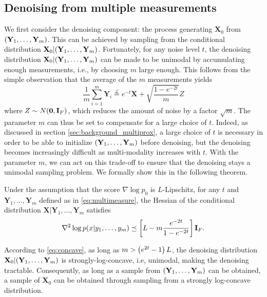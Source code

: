 \subsection{Denoising from multiple measurements}
We first consider the denoising component: the process generating $\mathbf{X}_0$ from $\mathopen{}\left(\mathbf{Y}_1, \dots, \mathbf{Y}_m\right)$. This can be achieved by sampling from the conditional distribution $\mathbf{X}_0|\mathopen{}\left(\mathbf{Y}_1, \dots, \mathbf{Y}_m\right)$. Fortunately, for any noise level $t$, the denoising distribution $\mathbf{X}_0|\mathopen{}\left(\mathbf{Y}_1, \dots, \mathbf{Y}_m\right)$ can be made to be unimodal by accumulating enough measurements, i.e., by choosing $m$ large enough. This follows from the simple observation that the average of the $m$ measurements yields
\begin{equation}
\frac{1}{m}\sum_{i=1}^m \mathbf{Y}_i \overset{\mathcal{L}}{=}  e^{-t} \mathbf{X} + \sqrt{\frac{1 - e^{-2t}}{m}}Z
\label{eq:noisereduction}
\end{equation}
where $Z \sim N\mathopen{}\left(\mathbf{0}, \mathbf{I}_F\right)$, which reduces the amount of noise by a factor $\sqrt{m}$. The parameter $m$ can thus be set to compensate for a large choice of $t$. Indeed, as discussed in section \ref{sec:background_multiprox}, a large choice of $t$ is necessary in order to be able to initialize $\mathopen{}\left(\mathbf{Y}_1, \dots, \mathbf{Y}_m\right)$ before denoising, but the denoising becomes increasingly difficult as multi-modality increases with $t$. With the parameter $m$, we can act on this trade-off to ensure that the denoising stays a unimodal sampling problem. We formally show this in the following theorem. 

\begin{theorem}
\label{thm:unimodality}
    Under the assumption that the score $\nabla \log p_0$ is $L$-Lipschitz, for any $t$ and $\mathbf{Y}_1, \dots, \mathbf{Y}_m$ defined as in \eqref{eq:multimeasure}, the Hessian of the conditional distribution $\mathbf{X}|\mathbf{Y}_1, \dots, \mathbf{Y}_m$ satisfies
    \begin{equation}
    \nabla ^2 \log p(x|y_1, \dots, y_m) \preceq \mathopen{}\left[L - m\frac{e^{-2t}}{1 - e^{-2t}}\right]\mathbf{I}_F.
    \label{eq:concave}
    \end{equation}
\end{theorem}

According to \eqref{eq:concave}, as long as $m > \mathopen{}\left(e^{2t} - 1\right) L$, the denoising distribution $\mathbf{X}_0|\mathopen{}\left(\mathbf{Y}_1, \dots, \mathbf{Y}_m\right)$ is strongly-log-concave, i.e, unimodal, making the denoising tractable. Consequently, as long as a sample from $\mathopen{}\left(\mathbf{Y}_1, \dots, \mathbf{Y}_m\right)$ can be obtained, a sample of $\mathbf{X}_0$ can be obtained through sampling from a strongly log-concave distribution.


